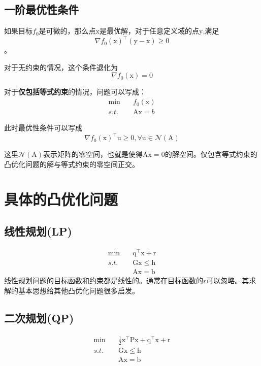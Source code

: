 \documentclass[a4paper]{D:/MyRepo/Script/latex/PaperReadingLog}
\begin{document}
\subsection{一阶最优性条件}
如果目标$f_0$是可微的，那么点$\mathrm{x}$是最优解，对于任意定义域的点$\mathrm{y}$,满足
$$\nabla f_0(\mathrm{x})^\top (\mathrm{y}-\mathrm{x})\ge 0$$。

对于无约束的情况，这个条件退化为
$$
\nabla f_0(\mathrm{x})=0
$$

对于\textbf{仅包括等式约束}的情况，问题可以写成：
$$
\begin{aligned}
    \min\quad&f_0(\mathrm{x})\\
    s.t.\quad&\mathrm{A}\mathrm{x}=b
\end{aligned}
$$

此时最优性条件可以写成
$$
\nabla f_0(\mathrm{x})^\top \mathrm{u}\ge 0,\forall \mathrm{u}\in\mathcal{N}(\mathrm{A})
$$

这里$\mathcal{N}(\mathrm{A})$表示矩阵的零空间，也就是使得$\mathrm{A}\mathrm{x}=0$的解空间。仅包含等式约束的凸优化问题的解与等式约束的零空间正交。


\section{具体的凸优化问题}
\subsection{线性规划(LP)}
\begin{equation}
    \label{equ:2}
    \begin{aligned}
        \min\quad&\mathrm{q}^\top \mathrm{x}+\mathrm{r}\\
        s.t.\quad&\mathrm{G}\mathrm{x}\le \mathrm{h}\\
        &\mathrm{A}\mathrm{x}=\mathrm{b}
    \end{aligned}
\end{equation}
线性规划问题的目标函数和约束都是线性的。通常在目标函数的$r$可以忽略。其求解的基本思想给其他凸优化问题很多启发。

\subsection{二次规划(QP)}
\begin{equation}
    \label{equ:3}
    \begin{aligned}
        \min\quad&\frac{1}{2}\mathrm{x}^\top\mathrm{P}\mathrm{x}+\mathrm{q}^\top\mathrm{x}+\mathrm{r}\\
        s.t.\quad&\mathrm{G}\mathrm{x}\le \mathrm{h}\\
        &\mathrm{A}\mathrm{x}=\mathrm{b}
    \end{aligned}
\end{equation}
\end{document}
